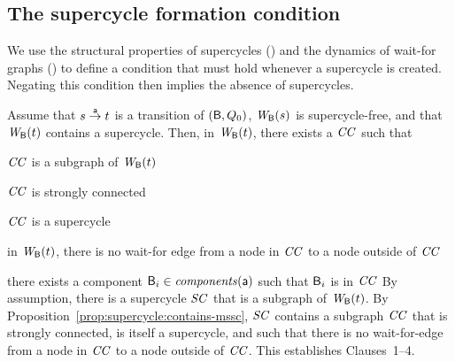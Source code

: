 







\subsection{The supercycle formation condition}

We use the structural properties of supercycles () and the 
dynamics of wait-for graphs () to define a condition that 
must hold whenever a supercycle is created. Negating this condition then implies the absence of
supercycles. 


 \label{prop:supercycle-formation}
Assume that $s \goesto[\act] t$ is a transition of $(\B, Q_0)$, $\wfg{\B}{s}$ is supercycle-free, and that $\wfg{\B}{t}$
contains a supercycle.  Then, in $\wfg{\B}{t}$, there exists a $\CC$ such that
\bn
\item $\CC$ is a subgraph of $\wfg{\B}{t}$
\item $\CC$ is strongly connected
\item $\CC$ is a supercycle
\item  in $\wfg{\B}{t}$, there is no wait-for edge from a node in $\CC$ to a node outside of $\CC$
\item there exists a component $\B_i \in \cmps{\act}$ such that $\B_i$ is in $\CC$
\en
\ep
%
\bpr
By assumption, there is a supercycle $\SC$ that is a subgraph of $\wfg{\B}{t}$.
By Proposition~\ref{prop:supercycle:contains-mssc}, $\SC$ contains a
subgraph $\CC$ that is strongly connected, is itself a supercycle, and
such that there is no wait-for-edge from a node in $\CC$ to a node outside of $\CC$.
This establishes Clauses~1--4.

